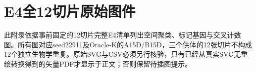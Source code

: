 \section{E4全12切片原始图件}
\label{sec:cc-e4-appendix-v1}
此附录依据事前固定的12切片完整E4清单列出空间聚类、标记基因与交叉计数图。所有图对应seed22911及Oracle-K的A15D/B15D，三个供体的12张切片不构成12个独立生物学重复。原始SVG与CSV必须另行核验，只有已经从真实SVG无重绘转换得到的矢量PDF才显示于正文；否则保留待插图提示。

